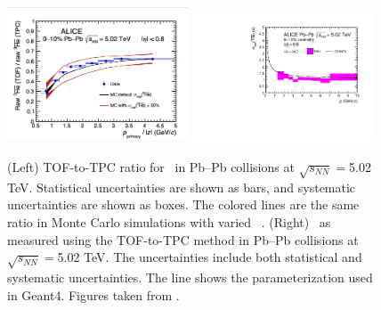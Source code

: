 \begin{figure}
    \centering
    \includegraphics[width=0.48\textwidth]{figures/he3bar_TOF-to-TPC-ratio.png}
    \includegraphics[width=0.48\textwidth]{figures/Antihelium_inelastic_cross_section_PbPb.pdf}
    \caption{(Left) TOF-to-TPC ratio for \ahe\ in Pb--Pb collisions at $\sqrt{s_{NN}}=$5.02 TeV. Statistical uncertainties are shown as bars, and systematic uncertainties are shown as boxes. The colored lines are the same ratio in Monte Carlo simulations with varied \sigmainel\ . (Right) \sigmainel\ as measured using the TOF-to-TPC method in Pb--Pb collisions at $\sqrt{s_{NN}}=$5.02 TeV. The uncertainties include both statistical and systematic uncertainties. The line shows the parameterization used in Geant4. Figures taken from \cite{antiHe3XS}.}
    \label{fig:Ahe_sigma_inel_PbPb}
\end{figure}

